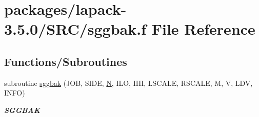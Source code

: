 \hypertarget{sggbak_8f}{}\section{packages/lapack-\/3.5.0/\+S\+R\+C/sggbak.f File Reference}
\label{sggbak_8f}
\subsection*{Functions/\+Subroutines}
\begin{DoxyCompactItemize}
\item 
subroutine \hyperlink{group__realGBcomputational_ga2acdb08b4db950b2c7c27e5b233de143}{sggbak} (J\+O\+B, S\+I\+D\+E, \hyperlink{polmisc_8c_a0240ac851181b84ac374872dc5434ee4}{N}, I\+L\+O, I\+H\+I, L\+S\+C\+A\+L\+E, R\+S\+C\+A\+L\+E, M, V, L\+D\+V, I\+N\+F\+O)
\begin{DoxyCompactList}\small\item\em {\bfseries S\+G\+G\+B\+A\+K} \end{DoxyCompactList}\end{DoxyCompactItemize}
